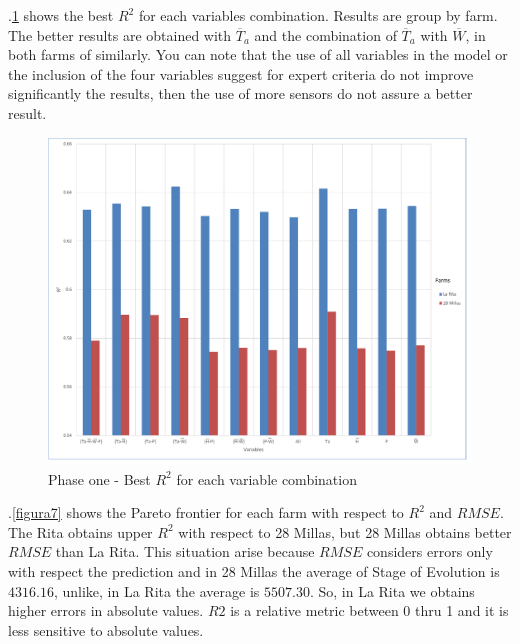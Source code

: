 \documentclass[review,authoryear,english]{elsarticle}
\begin{document}
\figurename $.$\ref{figura6} shows the best $R^2$ for each variables combination. Results are group by farm. The better results are obtained with $\overline{T}_{a}$ and the combination of $\overline{T}_{a}$ with $\overline{W}$, in both farms of similarly. You can note that the use of all variables in the model or the inclusion of the four variables suggest for expert criteria do not improve significantly the results, then the use of more sensors do not assure a better result. 

\begin{figure}[H] 
 \centering
 \includegraphics[scale=.5]{Phase_one_Best_R2_for_variables}
 \caption{Phase one - Best $R^2$ for each variable combination} 
 \label{figura6} 
\end{figure}

\figurename $.$\ref{figura7} shows the Pareto frontier for each farm with respect to $R^2$ and $RMSE$. The Rita obtains upper $R^2$ with respect to 28 Millas, but 28 Millas obtains better $RMSE$ than La Rita. This situation arise because $RMSE$ considers errors only with respect the prediction and in 28 Millas the average of Stage of Evolution is $4316.16$, unlike, in La Rita the average is $5507.30$. So, in La Rita we obtains higher errors in absolute values. $R2$ is a relative metric between 0 thru 1 and it is less sensitive to absolute values.
\end{document}
